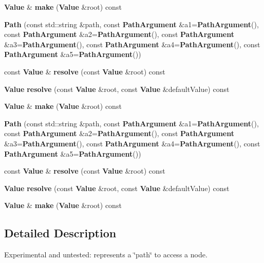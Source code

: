 \begin{DoxyCompactItemize}
\item 
{\bf Value} \& {\bf make} ({\bf Value} \&root) const 
\item 
{\bfseries Path} (const std\+::string \&path, const {\bf Path\+Argument} \&a1={\bf Path\+Argument}(), const {\bf Path\+Argument} \&a2={\bf Path\+Argument}(), const {\bf Path\+Argument} \&a3={\bf Path\+Argument}(), const {\bf Path\+Argument} \&a4={\bf Path\+Argument}(), const {\bf Path\+Argument} \&a5={\bf Path\+Argument}())\label{class_json_1_1_path_aaa37a99650e770d0cd680bf53585ec99}

\item 
const {\bf Value} \& {\bfseries resolve} (const {\bf Value} \&root) const \label{class_json_1_1_path_a781d60b27fdb34f228018e5b1ce16d59}

\item 
{\bf Value} {\bfseries resolve} (const {\bf Value} \&root, const {\bf Value} \&default\+Value) const \label{class_json_1_1_path_a33d1749770a4cf74e9a3de419bc7febe}

\item 
{\bf Value} \& {\bf make} ({\bf Value} \&root) const 
\item 
{\bfseries Path} (const std\+::string \&path, const {\bf Path\+Argument} \&a1={\bf Path\+Argument}(), const {\bf Path\+Argument} \&a2={\bf Path\+Argument}(), const {\bf Path\+Argument} \&a3={\bf Path\+Argument}(), const {\bf Path\+Argument} \&a4={\bf Path\+Argument}(), const {\bf Path\+Argument} \&a5={\bf Path\+Argument}())\label{class_json_1_1_path_aaa37a99650e770d0cd680bf53585ec99}

\item 
const {\bf Value} \& {\bfseries resolve} (const {\bf Value} \&root) const \label{class_json_1_1_path_a781d60b27fdb34f228018e5b1ce16d59}

\item 
{\bf Value} {\bfseries resolve} (const {\bf Value} \&root, const {\bf Value} \&default\+Value) const \label{class_json_1_1_path_a33d1749770a4cf74e9a3de419bc7febe}

\item 
{\bf Value} \& {\bf make} ({\bf Value} \&root) const 
\end{DoxyCompactItemize}


\subsection{Detailed Description}
Experimental and untested\+: represents a \char`\"{}path\char`\"{} to access a node. 

